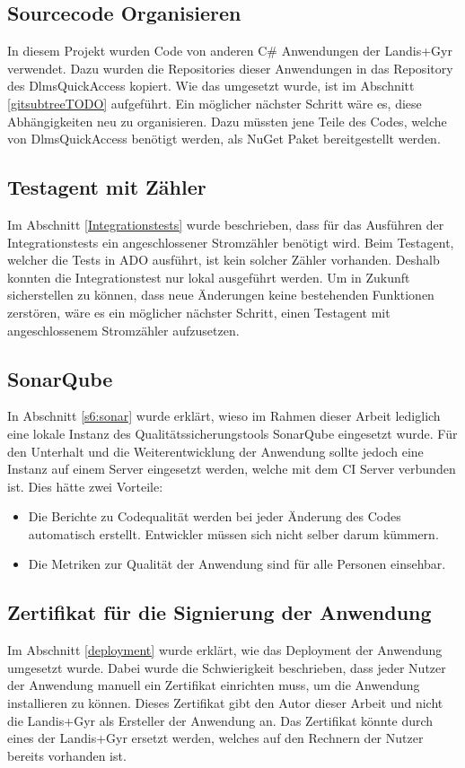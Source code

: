 \subsection{Sourcecode Organisieren}\label{ausblick:ats_split}
In diesem Projekt wurden Code von anderen C\# Anwendungen der Landis+Gyr verwendet.
Dazu wurden die Repositories dieser Anwendungen in das Repository des DlmsQuickAccess kopiert.
Wie das umgesetzt wurde, ist im Abschnitt \ref{gitsubtreeTODO} aufgeführt. 
Ein möglicher nächster Schritt wäre es, diese Abhängigkeiten neu zu organisieren.
Dazu müssten jene Teile des Codes, welche von DlmsQuickAccess benötigt werden, als NuGet Paket bereitgestellt werden.


\subsection{Testagent mit Zähler}
Im Abschnitt \ref{Integrationstests} wurde beschrieben, dass für das Ausführen der Integrationstests ein angeschlossener Stromzähler benötigt wird.
Beim Testagent, welcher die Tests in \ac{ADO} ausführt, ist kein solcher Zähler vorhanden.
Deshalb konnten die Integrationstest nur lokal ausgeführt werden.
Um in Zukunft sicherstellen zu können, dass neue Änderungen keine bestehenden Funktionen zerstören, wäre es ein möglicher nächster Schritt, einen Testagent mit angeschlossenem Stromzähler aufzusetzen.

\subsection{SonarQube}
In Abschnitt \ref{s6:sonar} wurde erklärt, wieso im Rahmen dieser Arbeit lediglich eine lokale Instanz des Qualitätssicherungstools SonarQube eingesetzt wurde.
Für den Unterhalt und die Weiterentwicklung der Anwendung sollte jedoch eine Instanz auf einem Server eingesetzt werden, welche mit dem \ac{CI} Server verbunden ist.
Dies hätte zwei Vorteile:
\begin{itemize}
   \item Die Berichte zu Codequalität werden bei jeder Änderung des Codes automatisch erstellt. 
Entwickler müssen sich nicht selber darum kümmern.
   \item Die Metriken zur Qualität der Anwendung sind für alle Personen einsehbar.
\end{itemize}


\subsection{Zertifikat für die Signierung der Anwendung}\label{ausblick:cert}
Im Abschnitt \ref{deployment} wurde erklärt, wie das Deployment der Anwendung umgesetzt wurde.
Dabei wurde die Schwierigkeit beschrieben, dass jeder Nutzer der Anwendung manuell ein Zertifikat einrichten muss, um die Anwendung installieren zu können.
Dieses Zertifikat gibt den Autor dieser Arbeit und nicht die Landis+Gyr als Ersteller der Anwendung an.
Das Zertifikat könnte durch eines der Landis+Gyr ersetzt werden, welches auf den Rechnern der Nutzer bereits vorhanden ist.


